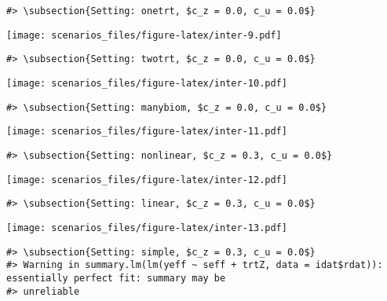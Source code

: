 \documentclass[
]{article}
\begin{document}
\begin{verbatim}
#> \subsection{Setting: onetrt, $c_z = 0.0, c_u = 0.0$}
\end{verbatim}

\texttt{[image: scenarios\_files/figure-latex/inter-9.pdf]}

\begin{verbatim}
#> \subsection{Setting: twotrt, $c_z = 0.0, c_u = 0.0$}
\end{verbatim}

\texttt{[image: scenarios\_files/figure-latex/inter-10.pdf]}

\begin{verbatim}
#> \subsection{Setting: manybiom, $c_z = 0.0, c_u = 0.0$}
\end{verbatim}

\texttt{[image: scenarios\_files/figure-latex/inter-11.pdf]}

\begin{verbatim}
#> \subsection{Setting: nonlinear, $c_z = 0.3, c_u = 0.0$}
\end{verbatim}

\texttt{[image: scenarios\_files/figure-latex/inter-12.pdf]}

\begin{verbatim}
#> \subsection{Setting: linear, $c_z = 0.3, c_u = 0.0$}
\end{verbatim}

\texttt{[image: scenarios\_files/figure-latex/inter-13.pdf]}

\begin{verbatim}
#> \subsection{Setting: simple, $c_z = 0.3, c_u = 0.0$}
#> Warning in summary.lm(lm(yeff ~ seff + trtZ, data = idat$rdat)): essentially perfect fit: summary may be
#> unreliable
\end{verbatim}
\end{document}

